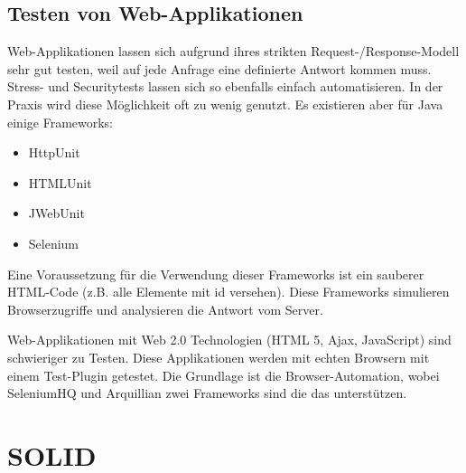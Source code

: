 \subsection{Testen von Web-Applikationen}

Web-Applikationen lassen sich aufgrund ihres strikten Request-/Response-Modell sehr gut testen, weil auf jede Anfrage eine definierte Antwort kommen muss. Stress- und Securitytests lassen sich so ebenfalls einfach automatisieren. In der Praxis wird diese Möglichkeit oft zu wenig genutzt. Es existieren aber für Java einige Frameworks:
\begin{itemize}
	\item HttpUnit
	\item HTMLUnit
	\item JWebUnit
	\item Selenium
\end{itemize}
Eine Voraussetzung für die Verwendung dieser Frameworks ist ein sauberer HTML-Code (z.B. alle Elemente mit id versehen). Diese Frameworks simulieren Browserzugriffe und analysieren die Antwort vom Server.
 
Web-Applikationen mit Web 2.0 Technologien (HTML 5, Ajax, JavaScript) sind schwieriger zu Testen. Diese Applikationen werden mit echten Browsern mit einem Test-Plugin getestet. Die Grundlage ist die Browser-Automation, wobei SeleniumHQ und Arquillian zwei Frameworks sind die das unterstützen. 

\section{SOLID}